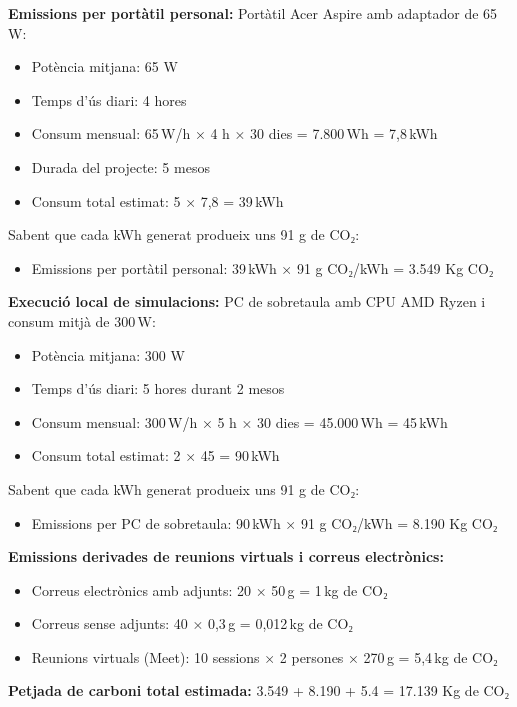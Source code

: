\textbf{Emissions per portàtil personal:} Portàtil Acer Aspire amb adaptador de 65 W:
\begin{itemize}
    \item Potència mitjana: 65 W
    \item Temps d'ús diari: 4 hores
    \item Consum mensual: 65 W/h × 4 h × 30 dies = 7.800 Wh = 7,8 kWh
    \item Durada del projecte: 5 mesos
    \item Consum total estimat: 5 × 7,8 = 39 kWh
\end{itemize}

Sabent que cada kWh generat produeix uns 91 g de CO₂:
\begin{itemize}
    \item Emissions per portàtil personal: 39 kWh × 91 g CO₂/kWh = 3.549 Kg CO₂
\end{itemize}

\textbf{Execució local de simulacions:} PC de sobretaula amb CPU AMD Ryzen i consum mitjà de 300 W:
\begin{itemize}
    \item Potència mitjana: 300 W
    \item Temps d'ús diari: 5 hores durant 2 mesos
    \item Consum mensual: 300 W/h × 5 h × 30 dies = 45.000 Wh = 45 kWh
    \item Consum total estimat: 2 × 45 = 90 kWh
\end{itemize}

Sabent que cada kWh generat produeix uns 91 g de CO₂:
\begin{itemize}
    \item Emissions per PC de sobretaula: 90 kWh × 91 g CO₂/kWh = 8.190 Kg CO₂
\end{itemize}

\textbf{Emissions derivades de reunions virtuals i correus electrònics:}
\begin{itemize}
    \item Correus electrònics amb adjunts: 20 × 50 g = 1 kg de CO₂
    \item Correus sense adjunts: 40 × 0,3 g = 0,012 kg de CO₂
    \item Reunions virtuals (Meet): 10 sessions × 2 persones × 270 g = 5,4 kg de CO₂
\end{itemize}

\textbf{Petjada de carboni total estimada:}
3.549 + 8.190 + 5.4 = 17.139 Kg de CO₂

